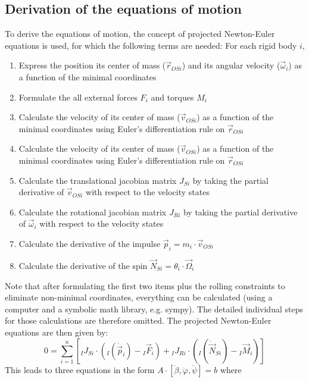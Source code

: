 \documentclass{article}
\begin{document}
\subsection{Derivation of the equations of motion}
To derive the equations of motion, the concept of projected Newton-Euler equations is used, for which the following terms are needed:
For each rigid body $i$, 
\begin{enumerate}
	\item Express the position its center of mass ($\vec{r}_{OSi}$) and its angular velocity ($\vec{\omega}_i$) as a function of the minimal coordinates
	\item Formulate the all external forces $F_i$ and torques $M_i$
	\item Calculate the velocity of its center of mass ($\vec{v}_{OSi}$) as a function of the minimal coordinates using Euler's differentiation rule on $\vec{r}_{OSi}$
	\item Calculate the velocity of its center of mass ($\vec{v}_{OSi}$) as a function of the minimal coordinates using Euler's differentiation rule on $\vec{r}_{OSi}$
	\item Calculate the translational jacobian matrix $J_{Si}$ by taking the partial derivative of $\vec{v}_{OSi}$ with respect to the velocity states
	\item Calculate the rotational jacobian matrix $J_{Ri}$ by taking the partial derivative of $\vec{\omega}_i$ with respect to the velocity states
	\item Calculate the derivative of the impulse $\vec{p}_{i} = m_i \cdot \vec{v}_{OSi}$
	\item Calculate the derivative of the spin $\vec{N}_{Si} = \theta_i \cdot \vec{\Omega}_{i}$
\end{enumerate}
Note that after formulating the first two items plus the rolling constraints to eliminate non-minimal coordinates, everything can be calculated (using a computer and a symbolic math library, e.g. sympy). The detailed individual steps for those calculations are therefore omitted.
The projected Newton-Euler equations are then given by:
\begin{equation}
0 = \sum_{i=1}^n \left[{}_I J_{Si} \cdot \left( {}_I \left(\dot{\vec{p}}_i \right) - {}_I \vec{F}_i \right) + {}_I J_{Ri} \cdot \left( {}_I \left(\dot{\vec{N}}_{Si} \right) - {}_I \vec{M}_i \right) \right]
\end{equation}
This leads to three equations in the form $A \cdot [\ddot{\beta}, \ddot{\varphi}, \ddot{\psi}] = b$ where
\end{document}
